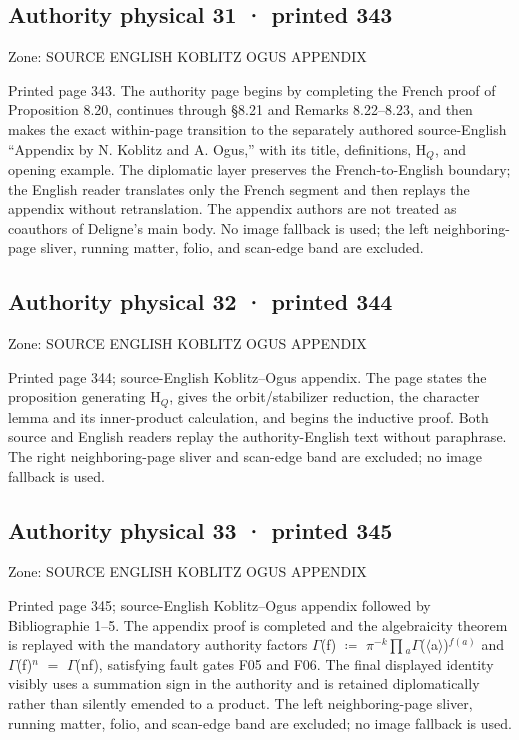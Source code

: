 \documentclass[10pt,twoside]{article}
\begin{document}
\subsection*{Authority physical 31 · printed 343}
\noindent\textsf{Zone: SOURCE ENGLISH KOBLITZ OGUS APPENDIX}\par
Printed page 343. The authority page begins by completing the French proof of Proposition 8.20, continues through \S{}8.21 and Remarks 8.22–8.23, and then makes the exact within-page transition to the separately authored source-English “Appendix by N. Koblitz and A. Ogus,” with its title, definitions, H\ensuremath{_{Q}}, and opening example. The diplomatic layer preserves the French-to-English boundary; the English reader translates only the French segment and then replays the appendix without retranslation. The appendix authors are not treated as coauthors of Deligne’s main body. No image fallback is used; the left neighboring-page sliver, running matter, folio, and scan-edge band are excluded.\par
\subsection*{Authority physical 32 · printed 344}
\noindent\textsf{Zone: SOURCE ENGLISH KOBLITZ OGUS APPENDIX}\par
Printed page 344; source-English Koblitz–Ogus appendix. The page states the proposition generating H\ensuremath{_{Q}}, gives the orbit/stabilizer reduction, the character lemma and its inner-product calculation, and begins the inductive proof. Both source and English readers replay the authority-English text without paraphrase. The right neighboring-page sliver and scan-edge band are excluded; no image fallback is used.\par
\subsection*{Authority physical 33 · printed 345}
\noindent\textsf{Zone: SOURCE ENGLISH KOBLITZ OGUS APPENDIX}\par
Printed page 345; source-English Koblitz–Ogus appendix followed by Bibliographie 1–5. The appendix proof is completed and the algebraicity theorem is replayed with the mandatory authority factors \ensuremath{Γ}(f) \ensuremath{≔} \ensuremath{π}\ensuremath{^{-k}}\ensuremath{∏}\ensuremath{_{a}}\ensuremath{Γ}(\ensuremath{⟨}a\ensuremath{⟩})\ensuremath{^{f(a)}} and \ensuremath{Γ}(f)\ensuremath{^{n}} \ensuremath{=} \ensuremath{Γ}(nf), satisfying fault gates F05 and F06. The final displayed identity visibly uses a summation sign in the authority and is retained diplomatically rather than silently emended to a product. The left neighboring-page sliver, running matter, folio, and scan-edge band are excluded; no image fallback is used.\par
\end{document}

